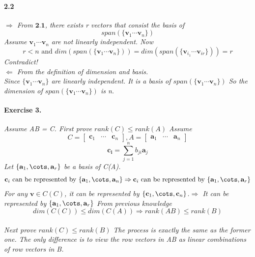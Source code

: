 \documentclass{article}
\begin{document}
  \paragraph{2.2}
  \textit{
    $\Rightarrow$ From $\textbf{2.1}$, there exists r vectors that consist the basis of  \[
    span( \{ \mathbf{v}_1 \cdots \mathbf{v}_n\})
    \]
    Assume $\mathbf{v}_1 \cdots \mathbf{v}_n$ are not linearly independent. Now
    \[
    r < n \text{ and } dim(span(\{\mathbf{v}_1 \cdots \mathbf{v}_n\})) = dim (span (\{\mathbf{v}_{i_1} \cdots \mathbf{v}_{ir}\})) = r 
    \]
    Contradict!
  } \\
  \textit{
    $\Leftarrow$ From the definition of dimension and basis.\\
    Since $\{\mathbf{v}_1 \cdots \mathbf{v}_n\}$ are linearly independent. It is a basis of $span(\{\mathbf{v}_1 \cdots \mathbf{v}_n\})$
    So the dimension of $span(\{\mathbf{v}_1 \cdots \mathbf{v}_n\})$ is n.
  }
\paragraph{Exercise 3.}
  \textit{
     Assume AB = C. First prove $rank(C) \leq rank(A)$ Assume 
     \[
     C =\begin{bmatrix}
        \mathbf{c}_1 & \cdots & \mathbf{c}_n
     \end{bmatrix} , 
     A = \begin{bmatrix}
        \mathbf{a}_1 & \cdots & \mathbf{a}_n
     \end{bmatrix} 
     \]
     \[
     \mathbf{c_i}= \sum_{j=1}^{n}b_{ji}\mathbf{a}_j
     \]
     Let $\{\mathbf{a}_1, \cots , \mathbf{a}_r\}$ be a basis of C(A).
     \[
     \mathbf{c}_i \text{ can be represented by }\{\mathbf{a}_1, \cots , \mathbf{a}_n\} \Rightarrow \mathbf{c}_i \text{ can be represented by }\{\mathbf{a}_1, \cots , \mathbf{a}_r\}
     \]
     For any $\mathbf{v} \in C(C)$, it can be represented by $\{\mathbf{c}_1, \cots , \mathbf{c}_n\}$.$\Rightarrow$ It can be represented by $\{\mathbf{a}_1, \cots , \mathbf{a}_r\}$
     From previous knowledge
     \[
     dim(C(C))\leq dim(C(A)) \Rightarrow rank(AB) \leq rank(B)
     \]
  } \\
  \textit{
    Next prove $rank(C) \leq rank(B)$ 
    The process is exactly the same as the former one. The only difference is to view the row vectors in AB as linear combinations of row vectors in B.
  }
\end{document}
